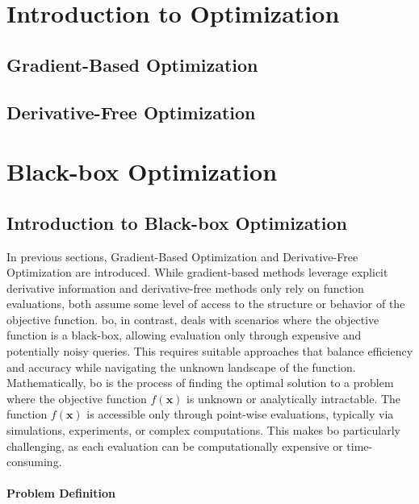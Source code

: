 \section{Introduction to Optimization}
\label{section:optimization_introduction}
\subsection{Gradient-Based Optimization}
\subsection{Derivative-Free Optimization}

\section{Black-box Optimization}
\label{section:black_box_optimization}
\subsection{Introduction to Black-box Optimization}
In previous sections, Gradient-Based Optimization and Derivative-Free Optimization are introduced. While gradient-based methods leverage explicit derivative information and derivative-free methods only rely on function evaluations, both assume some level of access to the structure or behavior of the objective function. \acf{bo}, in contrast, deals with scenarios where the objective function is a black-box, allowing evaluation only through expensive and potentially noisy queries. This requires suitable approaches that balance efficiency and accuracy while navigating the unknown landscape of the function.  Mathematically, \ac{bo} is the process of finding the optimal solution to a problem where the objective function  $f(\mathbf{x})$ is unknown or analytically intractable. The function $f(\mathbf{x})$ is accessible only through point-wise evaluations, typically via simulations, experiments, or complex computations. This makes \ac{bo} particularly challenging, as each evaluation can be computationally expensive or time-consuming.  

\paragraph{Problem Definition}

